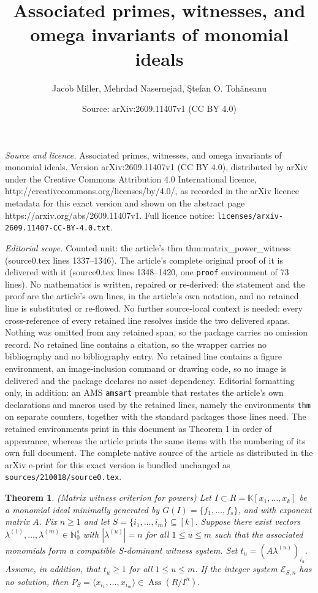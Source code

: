 \documentclass[10pt,a4paper]{amsart}
\title{Associated primes, witnesses, and omega invariants of monomial ideals}
\author{Jacob Miller, Mehrdad Nasernejad, \c{S}tefan O. Toh\v{a}neanu}
\date{Source: arXiv:2609.11407v1 (CC BY 4.0)}
\newtheorem{thm}{Theorem}
\begin{document}
\maketitle

\noindent\emph{Source and licence.} Associated primes, witnesses, and omega invariants of monomial ideals. Version arXiv:2609.11407v1 (CC BY 4.0), distributed by arXiv under the Creative Commons Attribution 4.0 International licence, http://creativecommons.org/licenses/by/4.0/, as recorded in the arXiv licence metadata for this exact version and shown on the abstract page https://arxiv.org/abs/2609.11407v1. Full licence notice: \texttt{licenses/arxiv-2609.11407-CC-BY-4.0.txt}.\par\smallskip

\noindent\textit{Editorial scope.} Counted unit: the article's thm thm:matrix\_power\_witness (source0.tex lines 1337--1346). The article's complete original proof of it is delivered with it (source0.tex lines 1348--1420, one \texttt{proof} environment of 73 lines). No mathematics is written, repaired or re-derived: the statement and the proof are the article's own lines, in the article's own notation, and no retained line is substituted or re-flowed.  No further source-local context is needed: every cross-reference of every retained line resolves inside the two delivered spans.  Nothing was omitted from any retained span, so the package carries no omission record.  No retained line contains a citation, so the wrapper carries no bibliography and no bibliography entry.  No retained line contains a figure environment, an image-inclusion command or drawing code, so no image is delivered and the package declares no asset dependency.  Editorial formatting only, in addition: an AMS \texttt{amsart} preamble that restates the article's own declarations and macros used by the retained lines, namely the environments \texttt{thm} on separate counters, together with the standard packages those lines need.  The retained environments print in this document as Theorem 1 in order of appearance, whereas the article prints the same items with the numbering of its own full document.  The complete native source of the article as distributed in the arXiv e-print for this exact version is bundled unchanged as \texttt{sources/210018/source0.tex}.
\begin{thm}{\rm (Matrix witness criterion for powers)}  \label{thm:matrix_power_witness}
Let $I \subset R=\mathbb K[x_1,\ldots,x_k]$ be a monomial ideal minimally generated by $G(I)=\{f_1,\ldots,f_s\}$, and with exponent matrix $A$. Fix $n\geq1$ and let
$S=\{i_1,\ldots,i_m\}\subseteq[k].$  Suppose there exist vectors
 $\lambda^{(1)},\ldots,\lambda^{(m)} \in\mathbb N_0^s$ with $|\lambda^{(u)}|=n$ for all $1\leq u \leq m$
 such that the associated monomials form a compatible $S$-dominant witness system. Set
 $t_u=(A\lambda^{(u)})_{i_u}.$ Assume, in addition, that $t_u\geq 1$ for all $1\leq u \leq m$.
 If the integer system $\mathcal E_{S,n}$ has no solution, then
 $P_S=\langle x_{i_1},\ldots,x_{i_m}\rangle \in \operatorname{Ass}(R/I^n).$
\end{thm}
\end{document}
